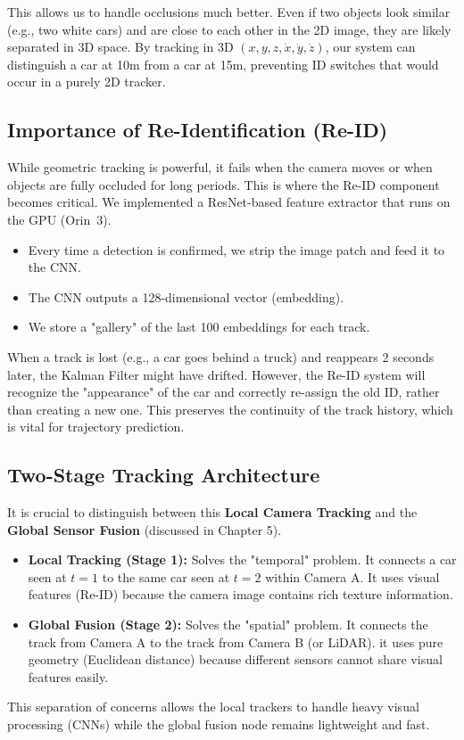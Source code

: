 \documentclass[12pt,a4paper]{report}
\begin{document}
{This allows us to handle occlusions much better. Even if two objects look similar (e.g., two white cars) and are close to each other in the 2D image, they are likely separated in 3D space. By tracking in 3D $(x, y, z, \dot{x}, \dot{y}, \dot{z})$, our system can distinguish a car at 10m from a car at 15m, preventing ID switches that would occur in a purely 2D tracker.

\subsection{Importance of Re-Identification (Re-ID)}
While geometric tracking is powerful, it fails when the camera moves or when objects are fully occluded for long periods. This is where the Re-ID component becomes critical. We implemented a ResNet-based feature extractor that runs on the GPU (Orin~3). 
\begin{itemize}
    \item Every time a detection is confirmed, we strip the image patch and feed it to the CNN.
    \item The CNN outputs a 128-dimensional vector (embedding).
    \item We store a "gallery" of the last 100 embeddings for each track.
\end{itemize}
When a track is lost (e.g., a car goes behind a truck) and reappears 2 seconds later, the Kalman Filter might have drifted. However, the Re-ID system will recognize the "appearance" of the car and correctly re-assign the old ID, rather than creating a new one. This preserves the continuity of the track history, which is vital for trajectory prediction.

\subsection{Two-Stage Tracking Architecture}
It is crucial to distinguish between this \textbf{Local Camera Tracking} and the \textbf{Global Sensor Fusion} (discussed in Chapter 5).
\begin{itemize}
    \item \textbf{Local Tracking (Stage 1):} Solves the "temporal" problem. It connects a car seen at $t=1$ to the same car seen at $t=2$ within Camera A. It uses visual features (Re-ID) because the camera image contains rich texture information.
    \item \textbf{Global Fusion (Stage 2):} Solves the "spatial" problem. It connects the track from Camera A to the track from Camera B (or LiDAR). it uses pure geometry (Euclidean distance) because different sensors cannot share visual features easily.
\end{itemize}
This separation of concerns allows the local trackers to handle heavy visual processing (CNNs) while the global fusion node remains lightweight and fast.

}
\end{document}
